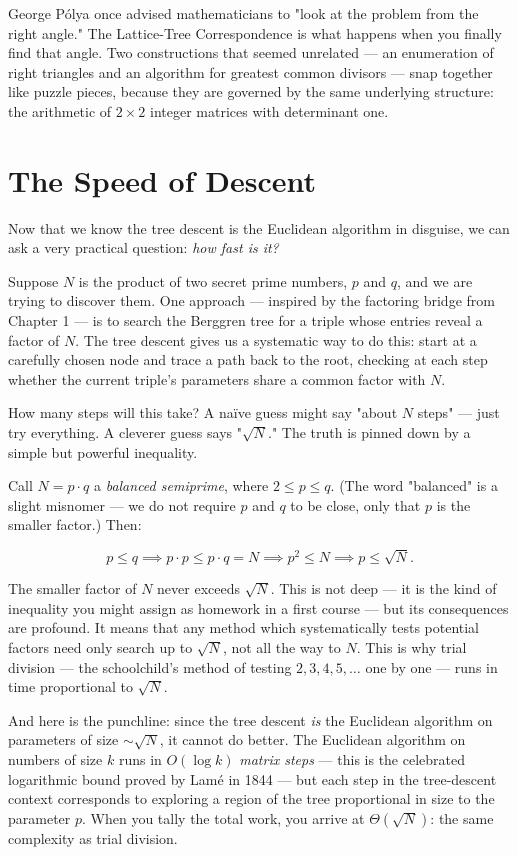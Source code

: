 \documentclass[11pt,twoside,openright]{book}
\theoremstyle{definition}
\theoremstyle{remark}
\begin{document}
George Pólya once advised mathematicians to "look at the problem from the right angle." The Lattice-Tree Correspondence is what happens when you finally find that angle. Two constructions that seemed unrelated --- an enumeration of right triangles and an algorithm for greatest common divisors --- snap together like puzzle pieces, because they are governed by the same underlying structure: the arithmetic of $2 \times 2$ integer matrices with determinant one.


\section{The Speed of Descent}

Now that we know the tree descent is the Euclidean algorithm in disguise, we can ask a very practical question: \textit{how fast is it?}

Suppose $N$ is the product of two secret prime numbers, $p$ and $q$, and we are trying to discover them. One approach --- inspired by the factoring bridge from Chapter 1 --- is to search the Berggren tree for a triple whose entries reveal a factor of $N$. The tree descent gives us a systematic way to do this: start at a carefully chosen node and trace a path back to the root, checking at each step whether the current triple's parameters share a common factor with $N$.

How many steps will this take? A naïve guess might say "about $N$ steps" --- just try everything. A cleverer guess says "$\sqrt{N}$." The truth is pinned down by a simple but powerful inequality.

Call $N = p \cdot q$ a \textit{balanced semiprime}, where $2 \le p \le q$. (The word "balanced" is a slight misnomer --- we do not require $p$ and $q$ to be close, only that $p$ is the smaller factor.) Then:

\[p \le q \implies p \cdot p \le p \cdot q = N \implies p^2 \le N \implies p \le \sqrt{N}.\]

The smaller factor of $N$ never exceeds $\sqrt{N}$. This is not deep --- it is the kind of inequality you might assign as homework in a first course --- but its consequences are profound. It means that any method which systematically tests potential factors need only search up to $\sqrt{N}$, not all the way to $N$. This is why trial division --- the schoolchild's method of testing $2, 3, 4, 5, \ldots$ one by one --- runs in time proportional to $\sqrt{N}$.

And here is the punchline: since the tree descent \textit{is} the Euclidean algorithm on parameters of size $\sim\!\sqrt{N}$, it cannot do better. The Euclidean algorithm on numbers of size $k$ runs in $O(\log k)$ \textit{matrix steps} --- this is the celebrated logarithmic bound proved by Lam\'e in 1844 --- but each step in the tree-descent context corresponds to exploring a region of the tree proportional in size to the parameter $p$. When you tally the total work, you arrive at $\Theta(\sqrt{N})$: the same complexity as trial division.
\end{document}
